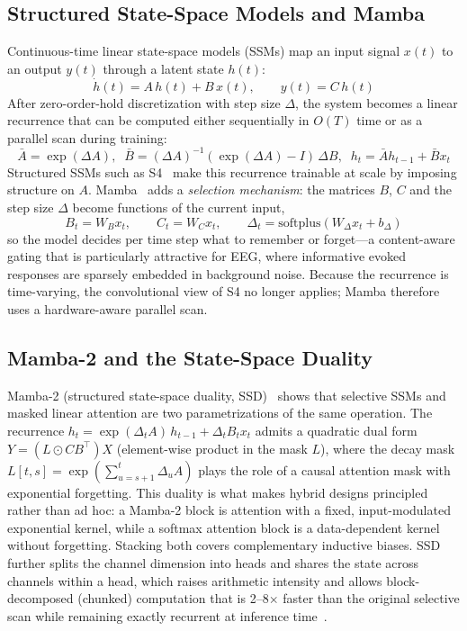 \documentclass[conference]{IEEEtran}
\begin{document}
\subsection{Structured State-Space Models and Mamba}
Continuous-time linear state-space models (SSMs) map an input signal $x(t)$
to an output $y(t)$ through a latent state $h(t)$:
\begin{equation}
\dot{h}(t) = A\,h(t) + B\,x(t), \qquad y(t) = C\,h(t)
\end{equation}
After zero-order-hold discretization with step size $\Delta$, the system
becomes a linear recurrence that can be computed either sequentially in
$O(T)$ time or as a parallel scan during training:
\begin{equation}
\bar{A} = \exp(\Delta A), \;\;
\bar{B} = (\Delta A)^{-1}(\exp(\Delta A)-I)\,\Delta B, \;\;
h_t = \bar{A}h_{t-1} + \bar{B}x_t
\end{equation}
Structured SSMs such as S4~\cite{gu2022s4} make this recurrence trainable at
scale by imposing structure on $A$. Mamba~\cite{gu2023mamba} adds a
\emph{selection mechanism}: the matrices $B$, $C$ and the step size $\Delta$
become functions of the current input,
\begin{equation}
B_t = W_B x_t, \qquad C_t = W_C x_t, \qquad
\Delta_t = \mathrm{softplus}(W_\Delta x_t + b_\Delta)
\end{equation}
so the model decides per time step what to remember or forget---a
content-aware gating that is particularly attractive for EEG, where
informative evoked responses are sparsely embedded in background noise.
Because the recurrence is time-varying, the convolutional view of S4 no
longer applies; Mamba therefore uses a hardware-aware parallel scan.

\subsection{Mamba-2 and the State-Space Duality}
Mamba-2 (structured state-space duality, SSD)~\cite{dao2024ssd} shows that
selective SSMs and masked linear attention are two parametrizations of the
same operation. The recurrence
$h_t = \exp(\Delta_t A)\,h_{t-1} + \Delta_t B_t x_t$ admits a quadratic dual
form $Y = (L \odot C B^\top) X$ (element-wise product in the mask $L$),
where the decay mask
$L[t,s] = \exp(\sum_{u=s+1}^{t} \Delta_u A)$ plays the role of a causal
attention mask with exponential forgetting. This duality is what makes
hybrid designs principled rather than ad hoc: a Mamba-2 block is attention
with a fixed, input-modulated exponential kernel, while a softmax attention
block is a data-dependent kernel without forgetting. Stacking both covers
complementary inductive biases. SSD further splits the channel dimension
into heads and shares the state across channels within a head, which raises
arithmetic intensity and allows block-decomposed (chunked) computation that
is 2--8$\times$ faster than the original selective scan while remaining
exactly recurrent at inference time~\cite{dao2024ssd}.
\end{document}
